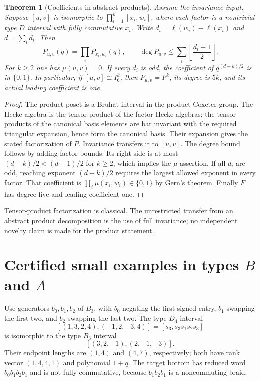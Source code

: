 \documentclass[11pt]{article}
\newtheorem{theorem}{Theorem}[section]
\theoremstyle{definition}\newtheorem{definition}[theorem]{Definition}
\theoremstyle{remark}\newtheorem{remark}[theorem]{Remark}
\begin{document}
\begin{theorem}[Coefficients in abstract products]\label{thm:product}
Assume the invariance input. Suppose $[u,v]$ is isomorphic to
$\prod_{i=1}^k[x_i,w_i]$, where each factor is a nontrivial type
$D$ interval with fully commutative $x_i$. Write
$d_i=\ell(w_i)-\ell(x_i)$ and $d=\sum_i d_i$. Then
\[
 P_{u,v}(q)=\prod_i P_{x_i,w_i}(q),\qquad
 \deg P_{u,v}\leq\sum_i\left\lfloor\frac{d_i-1}{2}\right\rfloor.
\]
For $k\geq2$ one has $\mu(u,v)=0$.
If every $d_i$ is odd, the coefficient of $q^{(d-k)/2}$ is in
$\{0,1\}$. In particular, if $[u,v]\cong I_6^k$, then
$P_{u,v}=F^k$, its degree is $5k$, and its actual leading
coefficient is one.
\end{theorem}
\begin{proof}
The product poset is a Bruhat interval in the product Coxeter group.
The Hecke algebra is the tensor product of the factor Hecke algebras;
the tensor products of the canonical basis elements are bar invariant
with the required triangular expansion, hence form the canonical basis.
Their expansion gives the stated factorization of $P$.
Invariance transfers it to $[u,v]$.
The degree bound follows by adding factor bounds. Its right side is
at most $(d-k)/2<(d-1)/2$ for $k\geq2$, which implies the $\mu$ assertion.
If all $d_i$ are odd, reaching exponent $(d-k)/2$ requires the largest
allowed exponent in every factor. That coefficient is
$\prod_i\mu(x_i,w_i)\in\{0,1\}$ by Gern's theorem.
Finally $F$ has degree five and leading coefficient one.
\end{proof}
Tensor-product factorization is classical. The unrestricted transfer
from an abstract product decomposition is the use of full invariance;
no independent novelty claim is made for the product statement.

\section{Certified small examples in types \texorpdfstring{$B$ and $A$}{B and A}}
Use generators $b_0,b_1,b_2$ of $B_3$, with $b_0$ negating the
first signed entry, $b_1$ swapping the first two, and $b_2$ swapping
the last two. The type $D_4$ interval
\[
 [(1,3,2,4),(-1,2,-3,4)]
 =[s_3,s_3s_1s_2s_3]
\]
is isomorphic to the type $B_3$ interval
\[
 [(3,2,-1),(2,-1,-3)].
\]
Their endpoint lengths are $(1,4)$ and $(4,7)$, respectively;
both have rank vector $(1,4,4,1)$ and polynomial $1+q$.
The target bottom has reduced word $b_0b_1b_2b_1$ and is not
fully commutative, because $b_1b_2b_1$ is a noncommuting braid.
\end{document}
